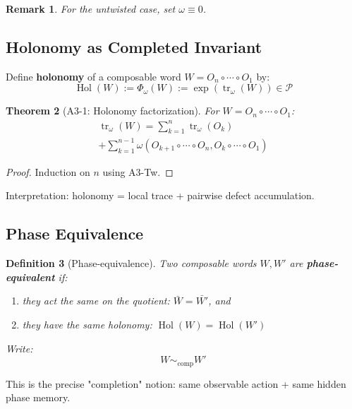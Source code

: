 \documentclass[12pt, oneside]{article}
\newtheorem{theorem}{Theorem}[section]
\newtheorem{definition}[theorem]{Definition}
\newtheorem{remark}[theorem]{Remark}
\DeclareMathOperator{\tr}{tr}
\DeclareMathOperator{\Hol}{Hol}
\begin{document}
\begin{remark}
For the untwisted case, set $\omega \equiv 0$.
\end{remark}

\subsection{Holonomy as Completed Invariant}

Define \textbf{holonomy} of a composable word $W = O_n \circ \cdots \circ O_1$ by:
\begin{equation}
\Hol(W) := \Phi_\omega(W) := \exp(\tr_\omega(W)) \in \mathcal{P}
\end{equation}

\begin{theorem}[A3-1: Holonomy factorization]
For $W = O_n \circ \cdots \circ O_1$:
\begin{multline}
\tr_\omega(W) = \sum_{k=1}^n \tr_\omega(O_k) \\ + \sum_{k=1}^{n-1} \omega(O_{k+1} \circ \cdots \circ O_n, O_k \circ \cdots \circ O_1)
\end{multline}
\end{theorem}

\begin{proof}
Induction on $n$ using A3-Tw.
\end{proof}

Interpretation: holonomy = local trace + pairwise defect accumulation.

\subsection{Phase Equivalence}

\begin{definition}[Phase-equivalence]
Two composable words $W, W'$ are \textbf{phase-equivalent} if:
\begin{enumerate}
    \item they act the same on the quotient: $\bar{W} = \bar{W'}$, and
    \item they have the same holonomy: $\Hol(W) = \Hol(W')$
\end{enumerate}
Write:
\begin{equation}
W \sim_{\text{comp}} W'
\end{equation}
\end{definition}

This is the precise "completion" notion: same observable action + same hidden phase memory.
\end{document}
